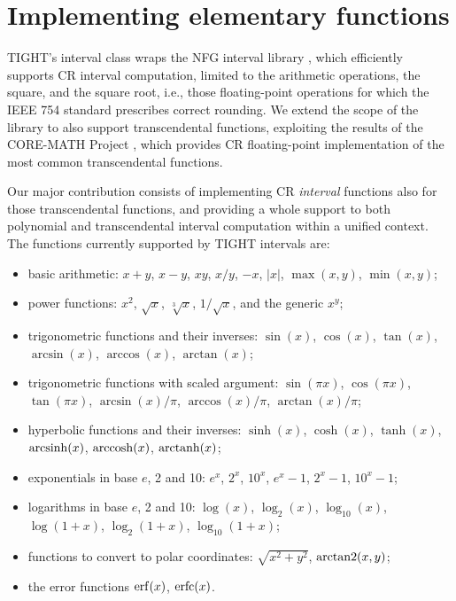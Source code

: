 
\section{Implementing elementary functions}
\label{sec:functions}
TIGHT's interval class wraps the NFG interval library \cite{nfg}, which efficiently supports CR interval computation, limited to the arithmetic operations, the square, and the square root, i.e., those floating-point operations for which the IEEE 754 standard prescribes correct rounding.
We extend the scope of the library to also support transcendental functions, exploiting the results of the CORE-MATH Project \cite{Sibidanov2022}, which provides CR floating-point implementation of the most common transcendental functions.

Our major contribution consists of implementing CR \emph{interval} functions also for those transcendental functions, and providing a whole support to both polynomial and transcendental interval computation within a unified context.
The functions currently supported by TIGHT intervals are:
\begin{itemize}
	\item basic arithmetic: $x+y$, $x-y$, $xy$, $x/y$, $-x$, $|x|$, $\max(x,y)$, $\min(x,y)$;
	\item power functions: $x^2$, $\sqrt{x}$, $\sqrt[3]{x}$, $1/\sqrt{x}$, and the generic $x^y$;
	\item trigonometric functions and their inverses: $\sin(x)$, $\cos(x)$, $\tan(x)$, $\arcsin(x)$, $\arccos(x)$, $\arctan(x)$;
	\item trigonometric functions with scaled argument: $\sin(\pi x)$, $\cos(\pi x)$, $\tan(\pi x)$, $\arcsin(x)/\pi$, $\arccos(x)/\pi$, $\arctan(x)/\pi$;
	\item hyperbolic functions and their inverses: $\sinh(x)$, $\cosh(x)$, $\tanh(x)$, $\operatorname{arcsinh}(x)$, $\operatorname{arccosh}(x)$, $\operatorname{arctanh}(x)$;
	\item exponentials in base $e$, 2 and 10: $e^x$, $2^x$, $10^x$, $e^x-1$, $2^x-1$, $10^x-1$;
	\item logarithms in base $e$, 2 and 10: $\log(x)$, $\log_2(x)$, $\log_{10}(x)$, $\log(1+x)$, $\log_2(1+x)$, $\log_{10}(1+x)$;
	\item functions to convert to polar coordinates: $\sqrt{x^2+y^2}$, $\operatorname{arctan2}(x,y)$;
	\item the error functions $\operatorname{erf}(x)$, $\operatorname{erfc}(x)$.
\end{itemize}


